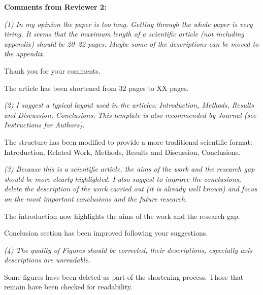 \documentclass[12pt]{letter}
\begin{document}
\begin{letter}{}

{\bf Comments from Reviewer 2:}

{\em (1) In my opinion the paper is too long. Getting through the whole paper is very tiring. It seems that the maximum length of a scientific article (not including appendix) should be 20–22 pages. Maybe some of the descriptions can be moved to the appendix.}

Thank you for your comments.

The article has been shortened from 32 pages to XX pages.

{\em (2) I suggest a typical layout used in the articles: Introduction, Methods, Results and Discussion, Conclusions. This template is also recommended by Journal (see Instructions for Authors).}

The structure has been modified to provide a more traditional scientific format: Introduction, Related Work, Methods, Results and Discussion, Conclusions.

{\em (3) Because this is a scientific article, the aims of the work and the research gap should be more clearly highlighted. I also suggest to improve the conclusions, delete the description of the work carried out (it is already well known) and focus on the most important conclusions and the future research. }

The introduction now highlights the aims of the work and the research gap.

Conclusion section has been improved following your suggestions.

{\em (4) The quality of Figures should be corrected, their descriptions, especially axis descriptions are unreadable.}

Some figures have been deleted as part of the shortening process. Those that remain have been checked for readability.

\end{letter}
\end{document}
